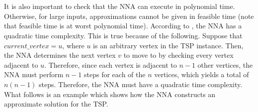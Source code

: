 \documentclass[12pt]{article}
\numberwithin{equation}{subsection}
\numberwithin{table}{subsection}
\numberwithin{algorithm}{subsection}
\numberwithin{figure}{subsection}
\begin{document}
\\\\It is also important to check that the NNA can execute in polynomial time. Otherwise, for large inputs, approximations cannot be given in feasible time (note that feasible time is at worst polynomial time). According to \cite{Rosenkrantz}, the NNA has a quadratic time complexity. This is true because of the following. Suppose that $current\_vertex = u$, where $u$ is an arbitrary vertex in the TSP instance. Then, the NNA determines the next vertex $v$ to move to by checking every vertex adjacent to $u$. Therefore, since each vertex is adjacent to $n-1$ other vertices, the NNA must perform $n-1$ steps for each of the $n$ vertices, which yields a total of $n(n-1)$ steps. Therefore, the NNA must have a quadratic time complexity. What follows is an example which shows how the NNA constructs an approximate solution for the TSP.
\end{document}
